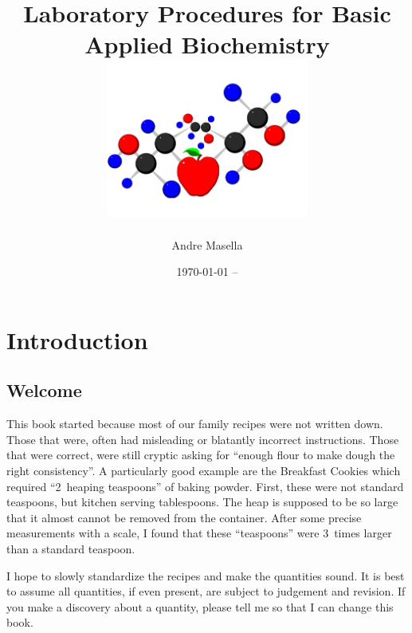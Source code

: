 \documentclass{book}
\begin{document}
\titlelabel{}
\pagestyle{fancy}
\fancyhf{}
\renewcommand{\chaptermark}[1]{\markboth{#1}{}}
 
\fancyhf{}
\fancyhead[LE,RO]{\thepage}
\fancyhead[RE]{\textit{\nouppercase{\leftmark}}}
\fancyhead[LO]{}

\thispagestyle{plain}

\title{Laboratory Procedures for Basic Applied Biochemistry \\
\includegraphics[width=0.5\textwidth,angle=-90]{CoverLogo} 
}
\author{ Andre Masella }
\date{\today{} -- }
\maketitle

\tableofcontents

\chapter{Introduction}

\section{Welcome}

This book started because most of our family recipes were not written down. Those that were, often had misleading or blatantly incorrect instructions. Those that were correct, were still cryptic asking for ``enough flour to make dough the right consistency''. A particularly good example are the Breakfast Cookies which required ``2~heaping teaspoons'' of baking powder. First, these were not standard teaspoons, but kitchen serving tablespoons. The heap is supposed to be so large that it almost cannot be removed from the container. After some precise measurements with a scale, I found that these ``teaspoons'' were 3~times larger than a standard teaspoon.

I hope to slowly standardize the recipes and make the quantities sound. It is best to assume all quantities, if even present, are subject to judgement and revision. If you make a discovery about a quantity, please tell me so that I can change this book.
\end{document}
